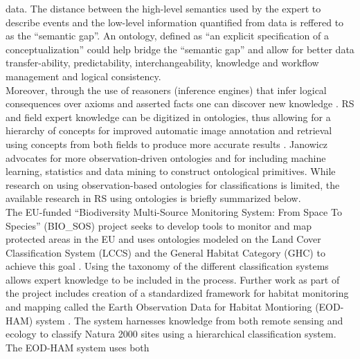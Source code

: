 \documentclass[authoryear, review,12pt,number]{elsarticle}
\begin{document}
data. The distance between the high-level semantics used 
by the expert to describe events and the low-level information quantified from 
data is reffered to as the ``semantic gap''. An ontology, defined as ``an 
explicit specification of a conceptualization'' \citep{gruber1993} could help 
bridge the ``semantic gap'' and allow for better data transfer-ability, 
predictability, interchangeability, knowledge and workflow management and 
logical consistency. 
\\
Moreover, through the use of reasoners (inference engines) 
that infer logical consequences over axioms and asserted facts one can discover 
new knowledge \citep{Arvor2013, Andres2013a}. RS and field expert knowledge can 
be digitized in ontologies, thus allowing for a hierarchy of concepts for 
improved automatic image annotation and retrieval using concepts from both 
fields to produce more accurate results 
\cite{Srikanth:2005:EOA:1076034.1076128}. Janowicz \cite{Janowicz2012} advocates 
for more observation-driven ontologies and for including machine learning, 
statistics and data mining to construct ontological primitives. While research 
on using observation-based ontologies for classifications is limited, the 
available research in RS using ontologies is briefly summarized below. \\
The EU-funded ``Biodiversity Multi-Source Monitoring System: From Space To
Species'' (BIO\_SOS) project seeks to develop tools to monitor and map protected
areas in the EU and uses ontologies modeled on the Land Cover Classification
System (LCCS) and the General Habitat Category (GHC) to achieve this goal
\citep{Arvor2013}. Using the taxonomy of the different classification systems
allows expert knowledge to be included in the process. Further work as part of
the project includes creation of a standardized
framework for habitat monitoring and mapping called the Earth Observation Data
for Habitat Montioring (EOD-HAM) system \citep{Lucas2015}. The system harnesses
knowledge from both remote sensing and ecology to classify Natura 2000 sites
using a hierarchical classification system. The EOD-HAM system uses both
\end{document}

